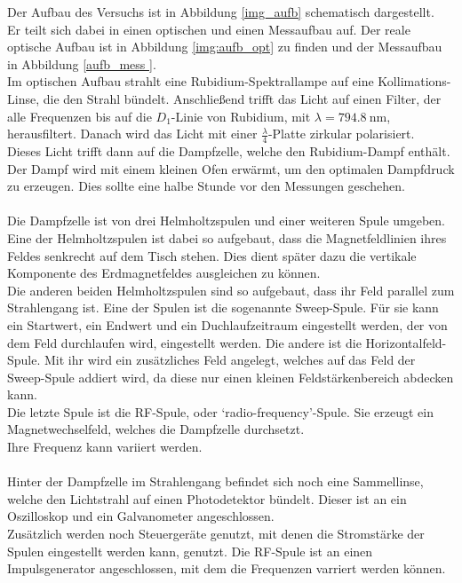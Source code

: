 Der Aufbau des Versuchs ist in Abbildung \ref{img_aufb} schematisch dargestellt.\\
Er teilt sich dabei in einen optischen und einen Messaufbau auf. Der reale optische Aufbau ist in Abbildung
\ref{img:aufb_opt} zu finden und der Messaufbau in Abbildung \ref{aufb_mess }.\\
Im optischen Aufbau strahlt eine Rubidium-Spektrallampe auf eine Kollimations-Linse, die den Strahl bündelt.
Anschließend trifft das Licht auf einen Filter, der alle Frequenzen bis auf die $D_1$-Linie von Rubidium, 
mit $\lambda = \SI{794.8}{\nano\metre}$, herausfiltert. Danach wird das Licht mit einer $\frac{\lambda}{4}$-Platte zirkular polarisiert.\\
Dieses Licht trifft dann auf die Dampfzelle, welche den Rubidium-Dampf enthält. 
Der Dampf wird mit einem kleinen Ofen erwärmt, um den optimalen Dampfdruck zu erzeugen.
Dies sollte eine halbe Stunde vor den Messungen geschehen.\\\\
Die Dampfzelle ist von drei Helmholtzspulen und einer weiteren Spule umgeben.\\
Eine der Helmholtzspulen ist dabei so aufgebaut, dass die Magnetfeldlinien ihres Feldes senkrecht auf dem Tisch stehen.
Dies dient später dazu die vertikale Komponente des Erdmagnetfeldes ausgleichen zu können.\\
Die anderen beiden Helmholtzspulen sind so aufgebaut, dass ihr Feld parallel zum Strahlengang ist.
Eine der Spulen ist die sogenannte Sweep-Spule. 
Für sie kann ein Startwert, ein Endwert und ein Duchlaufzeitraum eingestellt werden, der von dem Feld durchlaufen wird, eingestellt werden.
Die andere ist die Horizontalfeld-Spule. 
Mit ihr wird ein zusätzliches Feld angelegt, welches auf das Feld der Sweep-Spule addiert wird, da diese nur einen kleinen Feldstärkenbereich abdecken kann.\\
Die letzte Spule ist die RF-Spule, oder \enquote*{radio-frequency}-Spule. 
Sie erzeugt ein Magnetwechselfeld, welches die Dampfzelle durchsetzt.\\
Ihre Frequenz kann variiert werden.\\\\ 
Hinter der Dampfzelle im Strahlengang befindet sich noch eine Sammellinse, welche den Lichtstrahl auf einen Photodetektor bündelt.
Dieser ist an ein Oszilloskop und ein Galvanometer angeschlossen.\\
Zusätzlich werden noch Steuergeräte genutzt, mit denen die Stromstärke der Spulen eingestellt werden kann, genutzt.
Die RF-Spule ist an einen Impulsgenerator angeschlossen, mit dem die Frequenzen varriert werden können.\\


